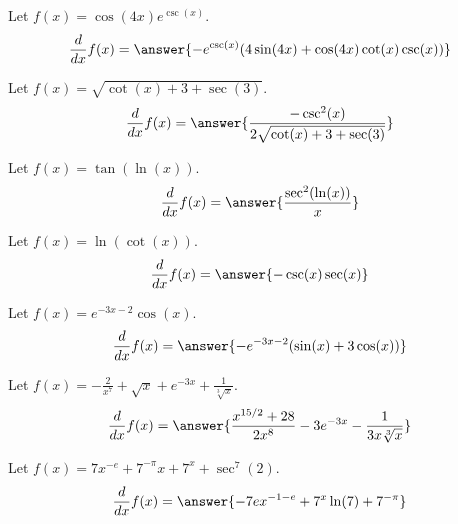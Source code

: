 \documentclass{ximera}
\begin{document}
\begin{shuffle}
\begin{exercise}
Let $f(x)=\cos (4 x) e^{\csc (x)}$.
\[
\ddx f(x) = \answer{-e^{\csc (x)} (4 \sin (4 x)+\cos (4 x) \cot (x) \csc (x))}
\]
\end{exercise}

\begin{exercise}
Let $f(x)=\sqrt{\cot (x)+3+\sec (3)}$.
\[
\ddx f(x) = \answer{\frac{-\csc ^2(x)}{2 \sqrt{\cot (x)+3+\sec (3)}}}
\]
\end{exercise}

\begin{exercise}
Let $f(x)=\tan (\ln (x))$.
\[
\ddx f(x) = \answer{\frac{\sec ^2(\ln (x))}{x}}
\]
\end{exercise}

\begin{exercise}
Let $f(x)=\ln (\cot (x))$.
\[
\ddx f(x) = \answer{-\csc (x) \sec (x)}
\]
\end{exercise}

\begin{exercise}
Let $f(x)=e^{-3 x-2} \cos (x)$.
\[
\ddx f(x) = \answer{-e^{-3 x-2} (\sin (x)+3 \cos (x))}
\]
\end{exercise}

\begin{exercise}
Let $f(x)=-\frac{2}{x^7}+\sqrt{x}+e^{-3 x}+\frac{1}{\sqrt[3]{x}}$.
\[
\ddx f(x) = \answer{\frac{x^{15/2}+28}{2 x^8}-3 e^{-3 x}-\frac{1}{3 x \sqrt[3]{x}}}
\]
\end{exercise}


\begin{exercise}
Let $f(x)=7 x^{-e}+7^{-\pi } x+7^x+\sec ^7(2)$.
\[
\ddx f(x) = \answer{-7 e x^{-1-e}+7^x \ln (7)+7^{-\pi }}
\]
\end{exercise}

  
\end{shuffle}
\end{document}
